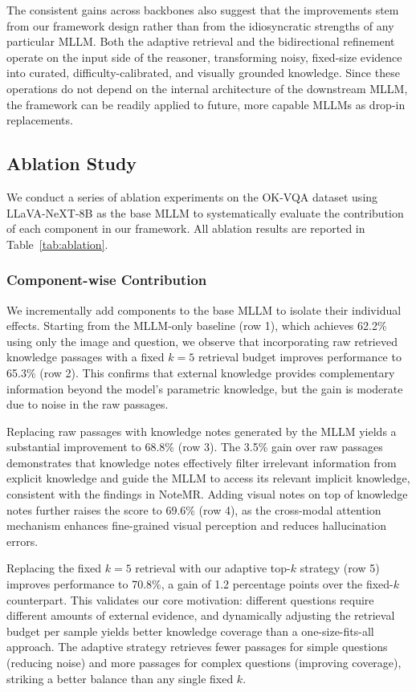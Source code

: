 \documentclass[manuscript,screen,review]{acmart}
\begin{document}
The consistent gains across backbones also suggest that the improvements stem from our framework design rather than from the idiosyncratic strengths of any particular MLLM. Both the adaptive retrieval and the bidirectional refinement operate on the input side of the reasoner, transforming noisy, fixed-size evidence into curated, difficulty-calibrated, and visually grounded knowledge. Since these operations do not depend on the internal architecture of the downstream MLLM, the framework can be readily applied to future, more capable MLLMs as drop-in replacements.

\subsection{Ablation Study}

We conduct a series of ablation experiments on the OK-VQA dataset using LLaVA-NeXT-8B as the base MLLM to systematically evaluate the contribution of each component in our framework. All ablation results are reported in Table~\ref{tab:ablation}.

\subsubsection{Component-wise Contribution}

We incrementally add components to the base MLLM to isolate their individual effects. Starting from the MLLM-only baseline (row 1), which achieves 62.2\% using only the image and question, we observe that incorporating raw retrieved knowledge passages with a fixed $k=5$ retrieval budget improves performance to 65.3\% (row 2). This confirms that external knowledge provides complementary information beyond the model's parametric knowledge, but the gain is moderate due to noise in the raw passages.

Replacing raw passages with knowledge notes generated by the MLLM yields a substantial improvement to 68.8\% (row 3). The 3.5\% gain over raw passages demonstrates that knowledge notes effectively filter irrelevant information from explicit knowledge and guide the MLLM to access its relevant implicit knowledge, consistent with the findings in NoteMR. Adding visual notes on top of knowledge notes further raises the score to 69.6\% (row 4), as the cross-modal attention mechanism enhances fine-grained visual perception and reduces hallucination errors.

Replacing the fixed $k=5$ retrieval with our adaptive top-$k$ strategy (row 5) improves performance to 70.8\%, a gain of 1.2 percentage points over the fixed-$k$ counterpart. This validates our core motivation: different questions require different amounts of external evidence, and dynamically adjusting the retrieval budget per sample yields better knowledge coverage than a one-size-fits-all approach. The adaptive strategy retrieves fewer passages for simple questions (reducing noise) and more passages for complex questions (improving coverage), striking a better balance than any single fixed $k$.
\end{document}
